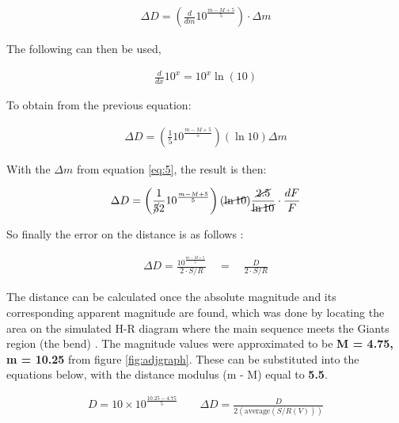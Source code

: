 \documentclass[12pt]{article}
\begin{document}
\vspace{-1.5ex}
\begin{gather*}
    \Delta D = \left( \frac{d}{dm} 10^{\frac{m - M + 5}{5}} \right) \cdot \Delta m
\end{gather*}

The following can then be used,

\vspace{-1.5ex}
\begin{gather*}
    \frac{d}{dx}10^{x} = 10^{x} \ln(10)
\end{gather*}

To obtain from the previous equation:

\vspace{-1.5ex}
\begin{gather*}
    \Delta D = \left( \frac{1}{5} 10^{\frac{m-M+5}{5}} \right) \left( \ln 10 \right) \Delta m
\end{gather*}

With the $\Delta m$ from equation \ref{eq:5}, the result is then:

\vspace{-1.5ex}
\begin{gather*}
    \Delta D = \left( \frac{1}{\cancel{5}2} 10^{\frac{m-M+5}{5}} \right) (\cancel{\ln 10}) \frac{\cancel{2.5}}{\cancel{\ln 10}} \cdot \frac{dF}{F}
\end{gather*}

So finally the error on the distance is as follows \cite{rian}:

\vspace{-1.5ex}
\begin{gather}
    \Delta D = \frac{10^{\frac{m-M+5}{5}}}{2 \cdot S/R} \quad = \quad \frac{D}{2 \cdot S/R}
\end{gather}

The distance can be calculated once the absolute magnitude and its corresponding apparent magnitude are found, which was done by locating the area on the simulated
H-R diagram where the main sequence meets the Giants region (the bend) \cite{dist}. The magnitude values were approximated to be \textbf{M = 4.75, m = 10.25} from figure \ref{fig:adjgraph}. These can be substituted
into the equations below, with the distance modulus (m - M) equal to \textbf{5.5}.

\begin{gather*}
    D = 10 \times 10^{\frac{10.25-4.75}{5}} \quad\quad \Delta D = \frac{D}{2 (\text{average}(S/R(V)))}
\end{gather*}
\end{document}
